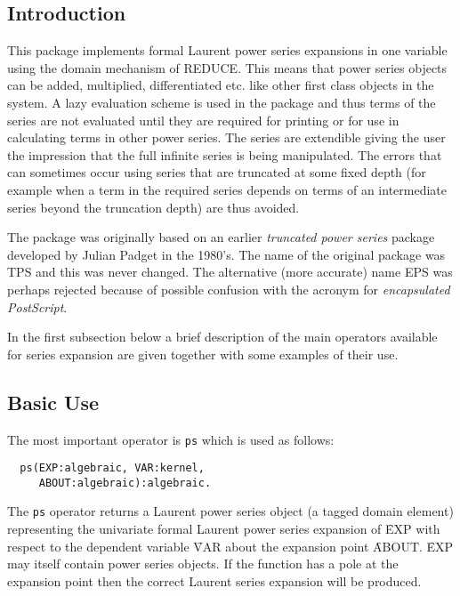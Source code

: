 
 
 
 
\subsection{Introduction}
This package implements formal Laurent power series expansions in one
variable using the domain mechanism of REDUCE. This means that power
series objects can be added, multiplied, differentiated etc. like other
first class objects in the system. A lazy evaluation scheme is used in
the package and thus terms of the series are not evaluated until they
are required for printing or for use in calculating terms in other
power series. The series are extendible giving the user the impression
that the full infinite series is being manipulated.  The errors that
can sometimes occur using series that are truncated at some fixed depth
(for example when a term in the required series depends on terms of an
intermediate series beyond the truncation depth) are thus avoided.

The package was originally based on an earlier \emph{truncated power series} package
developed by Julian Padget in the 1980's. The name of the original package was
TPS and this was never changed. The alternative (more accurate) name EPS was
perhaps rejected because of possible confusion with the acronym for
\emph{encapsulated PostScript}.

In the first subsection below a brief description of the main operators
available for series expansion are given together with some examples of
their use.

\subsection{Basic Use}
\hypertarget{operator:PS}{}
The most important operator is  \texttt{ps} which is used as follows:
\begin{verbatim}
  ps(EXP:algebraic, VAR:kernel, 
     ABOUT:algebraic):algebraic.
\end{verbatim}

The \texttt{ps} operator returns a Laurent power series object (a tagged domain
element) representing the univariate formal Laurent power series expansion of
\f{EXP} with respect to the dependent variable \f{VAR} about the expansion point
\f{ABOUT}.  \f{EXP} may itself contain power series objects.
If the function has a pole at the expansion point then the correct
Laurent series expansion will be produced.

